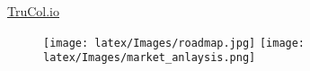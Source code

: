 %
\vspace{0.2cm}
\hspace{11cm}\href{https://www.TruCol.io}{TruCol.io}%
\vspace{-1.9cm}
\begin{figure}[H]
    \hspace{13cm}
    \texttt{[image: latex/Images/roadmap.jpg]}
    \texttt{[image: latex/Images/market\_anlaysis.png]}
\end{figure}




